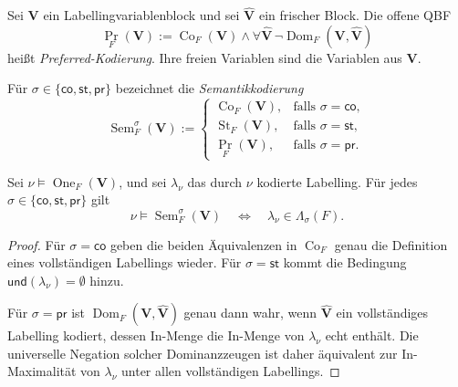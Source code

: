\begin{Definition}
    \label{def:preferred-encoding}
    Sei \(\mathbf V\) ein Labellingvariablenblock und sei
    \(\widehat{\mathbf V}\) ein frischer Block. Die offene QBF
    \[
        \operatorname{Pr}_F(\mathbf V)
        :=
        \operatorname{Co}_F(\mathbf V)
        \land
        \forall\widehat{\mathbf V}\,
        \neg\operatorname{Dom}_F
        (\mathbf V,\widehat{\mathbf V})
    \]
    heißt \emph{Preferred-Kodierung}. Ihre freien Variablen sind die
    Variablen aus \(\mathbf V\).
\end{Definition}

\begin{Definition}
    \label{def:uniform-semantics-predicate}
    Für
    \(\sigma\in\{\mathsf{co},\mathsf{st},\mathsf{pr}\}\) bezeichnet
    die \emph{Semantikkodierung}
    \[
        \operatorname{Sem}^{\sigma}_F(\mathbf V)
        :=
        \begin{cases}
            \operatorname{Co}_F(\mathbf V),
                &\text{falls }\sigma=\mathsf{co},\\
            \operatorname{St}_F(\mathbf V),
                &\text{falls }\sigma=\mathsf{st},\\
            \operatorname{Pr}_F(\mathbf V),
                &\text{falls }\sigma=\mathsf{pr}.
        \end{cases}
    \]
\end{Definition}

\begin{Lemma}
    \label{lem:semantics-encoding-correct}
    Sei \(\nu\models\operatorname{One}_F(\mathbf V)\), und sei
    \(\lambda_\nu\) das durch \(\nu\) kodierte Labelling. Für jedes
    \(\sigma\in\{\mathsf{co},\mathsf{st},\mathsf{pr}\}\) gilt
    \[
        \nu\models\operatorname{Sem}^{\sigma}_F(\mathbf V)
        \quad\Longleftrightarrow\quad
        \lambda_\nu\in\Lambda_\sigma(F).
    \]
\end{Lemma}

\begin{proof}
    Für \(\sigma=\mathsf{co}\) geben die beiden Äquivalenzen in
    \(\operatorname{Co}_F\) genau die Definition eines vollständigen
    Labellings wieder. Für \(\sigma=\mathsf{st}\) kommt die Bedingung
    \(\mathsf{und}(\lambda_\nu)=\emptyset\) hinzu.

    Für \(\sigma=\mathsf{pr}\) ist
    \(\operatorname{Dom}_F(\mathbf V,\widehat{\mathbf V})\) genau dann
    wahr, wenn \(\widehat{\mathbf V}\) ein vollständiges Labelling
    kodiert, dessen In-Menge die In-Menge von \(\lambda_\nu\) echt
    enthält. Die universelle Negation solcher Dominanzzeugen ist daher
    äquivalent zur In-Maximalität von \(\lambda_\nu\) unter allen
    vollständigen Labellings.
\end{proof}

